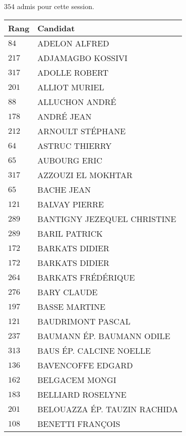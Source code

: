 




  $354$ admis pour cette session.

  \begin{xltabular}{\linewidth}{|l|X|}
    \hline
    \textbf{Rang} & \textbf{Candidat} \\
    \hline
    $84$ & ADELON ALFRED \\
    \hline
    $217$ & ADJAMAGBO KOSSIVI \\
    \hline
    $317$ & ADOLLE ROBERT \\
    \hline
    $201$ & ALLIOT MURIEL \\
    \hline
    $88$ & ALLUCHON ANDRÉ \\
    \hline
    $178$ & ANDRÉ JEAN \\
    \hline
    $212$ & ARNOULT STÉPHANE \\
    \hline
    $64$ & ASTRUC THIERRY \\
    \hline
    $65$ & AUBOURG ERIC \\
    \hline
    $317$ & AZZOUZI EL MOKHTAR \\
    \hline
    $65$ & BACHE JEAN \\
    \hline
    $121$ & BALVAY PIERRE \\
    \hline
    $289$ & BANTIGNY JEZEQUEL CHRISTINE \\
    \hline
    $289$ & BARIL PATRICK \\
    \hline
    $172$ & BARKATS DIDIER \\
    \hline
    $172$ & BARKATS DIDIER \\
    \hline
    $264$ & BARKATS FRÉDÉRIQUE \\
    \hline
    $276$ & BARY CLAUDE \\
    \hline
    $197$ & BASSE MARTINE \\
    \hline
    $121$ & BAUDRIMONT PASCAL \\
    \hline
    $237$ & BAUMANN ÉP. BAUMANN ODILE \\
    \hline
    $313$ & BAUS ÉP. CALCINE NOELLE \\
    \hline
    $136$ & BAVENCOFFE EDGARD \\
    \hline
    $162$ & BELGACEM MONGI \\
    \hline
    $183$ & BELLIARD ROSELYNE \\
    \hline
    $201$ & BELOUAZZA ÉP. TAUZIN RACHIDA \\
    \hline
    $108$ & BENETTI FRANÇOIS \\

\end{xltabular}
